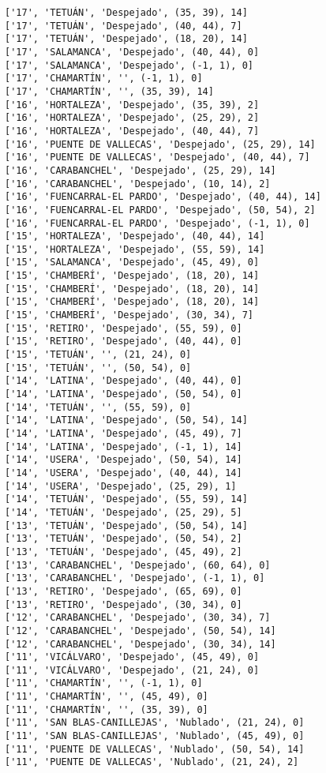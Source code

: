 \documentclass[11pt]{article}
\begin{document}
\begin{Verbatim}[commandchars=\\\{\}]
['17', 'TETUÁN', 'Despejado', (35, 39), 14]
['17', 'TETUÁN', 'Despejado', (40, 44), 7]
['17', 'TETUÁN', 'Despejado', (18, 20), 14]
['17', 'SALAMANCA', 'Despejado', (40, 44), 0]
['17', 'SALAMANCA', 'Despejado', (-1, 1), 0]
['17', 'CHAMARTÍN', '', (-1, 1), 0]
['17', 'CHAMARTÍN', '', (35, 39), 14]
['16', 'HORTALEZA', 'Despejado', (35, 39), 2]
['16', 'HORTALEZA', 'Despejado', (25, 29), 2]
['16', 'HORTALEZA', 'Despejado', (40, 44), 7]
['16', 'PUENTE DE VALLECAS', 'Despejado', (25, 29), 14]
['16', 'PUENTE DE VALLECAS', 'Despejado', (40, 44), 7]
['16', 'CARABANCHEL', 'Despejado', (25, 29), 14]
['16', 'CARABANCHEL', 'Despejado', (10, 14), 2]
['16', 'FUENCARRAL-EL PARDO', 'Despejado', (40, 44), 14]
['16', 'FUENCARRAL-EL PARDO', 'Despejado', (50, 54), 2]
['16', 'FUENCARRAL-EL PARDO', 'Despejado', (-1, 1), 0]
['15', 'HORTALEZA', 'Despejado', (40, 44), 14]
['15', 'HORTALEZA', 'Despejado', (55, 59), 14]
['15', 'SALAMANCA', 'Despejado', (45, 49), 0]
['15', 'CHAMBERÍ', 'Despejado', (18, 20), 14]
['15', 'CHAMBERÍ', 'Despejado', (18, 20), 14]
['15', 'CHAMBERÍ', 'Despejado', (18, 20), 14]
['15', 'CHAMBERÍ', 'Despejado', (30, 34), 7]
['15', 'RETIRO', 'Despejado', (55, 59), 0]
['15', 'RETIRO', 'Despejado', (40, 44), 0]
['15', 'TETUÁN', '', (21, 24), 0]
['15', 'TETUÁN', '', (50, 54), 0]
['14', 'LATINA', 'Despejado', (40, 44), 0]
['14', 'LATINA', 'Despejado', (50, 54), 0]
['14', 'TETUÁN', '', (55, 59), 0]
['14', 'LATINA', 'Despejado', (50, 54), 14]
['14', 'LATINA', 'Despejado', (45, 49), 7]
['14', 'LATINA', 'Despejado', (-1, 1), 14]
['14', 'USERA', 'Despejado', (50, 54), 14]
['14', 'USERA', 'Despejado', (40, 44), 14]
['14', 'USERA', 'Despejado', (25, 29), 1]
['14', 'TETUÁN', 'Despejado', (55, 59), 14]
['14', 'TETUÁN', 'Despejado', (25, 29), 5]
['13', 'TETUÁN', 'Despejado', (50, 54), 14]
['13', 'TETUÁN', 'Despejado', (50, 54), 2]
['13', 'TETUÁN', 'Despejado', (45, 49), 2]
['13', 'CARABANCHEL', 'Despejado', (60, 64), 0]
['13', 'CARABANCHEL', 'Despejado', (-1, 1), 0]
['13', 'RETIRO', 'Despejado', (65, 69), 0]
['13', 'RETIRO', 'Despejado', (30, 34), 0]
['12', 'CARABANCHEL', 'Despejado', (30, 34), 7]
['12', 'CARABANCHEL', 'Despejado', (50, 54), 14]
['12', 'CARABANCHEL', 'Despejado', (30, 34), 14]
['11', 'VICÁLVARO', 'Despejado', (45, 49), 0]
['11', 'VICÁLVARO', 'Despejado', (21, 24), 0]
['11', 'CHAMARTÍN', '', (-1, 1), 0]
['11', 'CHAMARTÍN', '', (45, 49), 0]
['11', 'CHAMARTÍN', '', (35, 39), 0]
['11', 'SAN BLAS-CANILLEJAS', 'Nublado', (21, 24), 0]
['11', 'SAN BLAS-CANILLEJAS', 'Nublado', (45, 49), 0]
['11', 'PUENTE DE VALLECAS', 'Nublado', (50, 54), 14]
['11', 'PUENTE DE VALLECAS', 'Nublado', (21, 24), 2]

\end{Verbatim}
\end{document}
